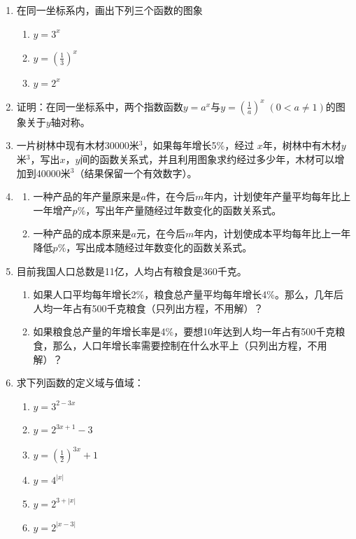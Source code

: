  \begin{enumerate}
     \item 在同一坐标系内，画出下列三个函数的图象
 \begin{multicols}{3}
 \begin{enumerate}[(1)]
     \item $y=3^x$
     \item $y=\left(\frac{1}{3}\right)^x$
     \item $y=2^x$
 \end{enumerate}
 \end{multicols}
 
 \item 证明：在同一坐标系中，两个指数函数$y=a^x$与$y=\left(\frac{1}{a}\right)^x\; (0<a\ne 1)$的图象关于$y$轴对称。
 \item 一片树林中现有木材30000米$^3$，如果每年增长5\%，经过
 $x$年，树林中有木材$y$米$^3$，写出$x$，$y$间的函数关系式，并且利用图象求约经过多少年，木材可以增加到40000米$^3$（结果保留一个有效数字）。
 \item \begin{enumerate}[(1)]
     \item 一种产品的年产量原来是$a$件，在今后$m$年内，计划使年产量平均每年比上一年增产$p\%$，写出年产量随经过年数变化的函数关系式。
     \item 一种产品的成本原来是$a$元，在今后$m$年内，计划使成本平均每年比上一年降低$p\%$，写出成本随经过年数变化的函数关系式。
 \end{enumerate}
 \item 目前我国人口总数是11亿，人均占有粮食是360千克。
 \begin{enumerate}[(1)]
     \item 如果人口平均每年增长2\%，粮食总产量平均每年增长4\%。那么，几年后人均一年占有500千克粮食（只列出方程，不用解）？
     \item 如果粮食总产量的年增长率是4\%，要想10年达到人均一年占有500千克粮食，那么，人口年增长率需要控制在什么水平上（只列出方程，不用解）？
 \end{enumerate}
 
 \item 求下列函数的定义域与值域： 
 \begin{multicols}{3}
 \begin{enumerate}[(1)]
     \item $y=3^{2-3x}$
     \item $y=2^{3x+1}-3$
     \item $y=\left(\frac{1}{2}\right)^{3x}+1$
     \item $y=4^{|x|}$
     \item $y=2^{3+|x|}$
     \item $y=2^{|x-3|}$
 \end{enumerate}
 \end{multicols}
 

\end{enumerate}
